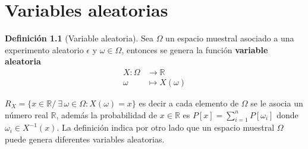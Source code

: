 \documentclass[10pt,]{krantz}
\theoremstyle{definition}
\newtheorem{definition}{Definición}[chapter]
\theoremstyle{definition}
\theoremstyle{definition}
\theoremstyle{definition}
\theoremstyle{remark}
\begin{document}
\hypertarget{variables-aleatorias}{%
\chapter{Variables aleatorias}\label{variables-aleatorias}}

\begin{definition}[Variable aleatoria]
\protect\hypertarget{def:unnamed-chunk-18}{}{\label{def:unnamed-chunk-18} {} }Sea \(\Omega\) un espacio muestral asociado a una experimento aleatorio \(\epsilon\) y \(\omega\in\Omega\), entonces se genera la función \textbf{variable aleatoria}
\begin{align*}
  X:\Omega&\longrightarrow \mathbb{R}\\
  \omega&\longmapsto X(\omega)
\end{align*}
\end{definition}
\(R_{X}=\{x\in \mathbb {R} /\ \exists \,\omega \in \Omega :X(\omega )=x\}\)
es decir a cada elemento de \(\Omega\) se le asocia un número real \(\mathbb{R}\), además la probabilidad de \(x\in \mathbb{R}\) es \(P[x]= \sum^{n}_{i=1}P\left[\omega_i\right]\) donde \(\omega_i\in X^{-1}(x)\). La definición indica por otro lado que un espacio muestral \(\Omega\) puede genera diferentes variables aleatorias.
\end{document}
